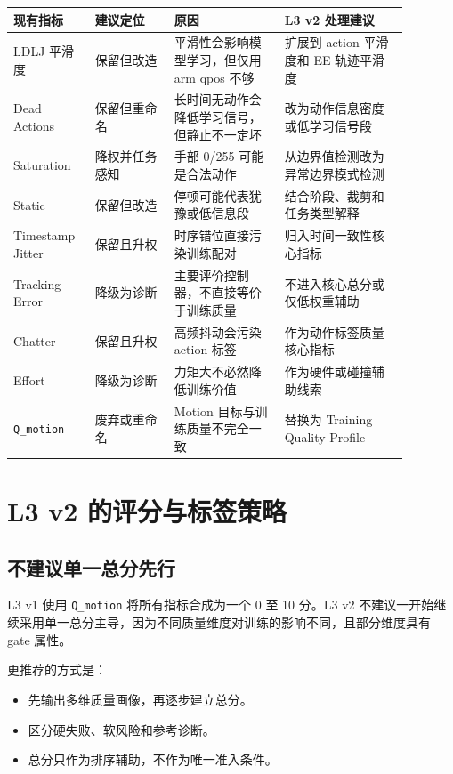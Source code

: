 \documentclass[UTF8,zihao=-4]{ctexart}
\begin{document}
\begin{longtable}{p{0.16\linewidth}p{0.18\linewidth}p{0.25\linewidth}p{0.29\linewidth}}
\toprule
\textbf{现有指标} & \textbf{建议定位} & \textbf{原因} & \textbf{L3 v2 处理建议} \\
\midrule
LDLJ 平滑度 & 保留但改造 & 平滑性会影响模型学习，但仅用 arm qpos 不够 & 扩展到 action 平滑度和 EE 轨迹平滑度 \\
Dead Actions & 保留但重命名 & 长时间无动作会降低学习信号，但静止不一定坏 & 改为动作信息密度或低学习信号段 \\
Saturation & 降权并任务感知 & 手部 0/255 可能是合法动作 & 从边界值检测改为异常边界模式检测 \\
Static & 保留但改造 & 停顿可能代表犹豫或低信息段 & 结合阶段、裁剪和任务类型解释 \\
Timestamp Jitter & 保留且升权 & 时序错位直接污染训练配对 & 归入时间一致性核心指标 \\
Tracking Error & 降级为诊断 & 主要评价控制器，不直接等价于训练质量 & 不进入核心总分或仅低权重辅助 \\
Chatter & 保留且升权 & 高频抖动会污染 action 标签 & 作为动作标签质量核心指标 \\
Effort & 降级为诊断 & 力矩大不必然降低训练价值 & 作为硬件或碰撞辅助线索 \\
\texttt{Q\_motion} & 废弃或重命名 & Motion 目标与训练质量不完全一致 & 替换为 Training Quality Profile \\
\bottomrule
\end{longtable}

\section{L3 v2 的评分与标签策略}

\subsection{不建议单一总分先行}

L3 v1 使用 \texttt{Q\_motion} 将所有指标合成为一个 0 至 10 分。L3 v2 不建议一开始继续采用单一总分主导，因为不同质量维度对训练的影响不同，且部分维度具有 gate 属性。

更推荐的方式是：

\begin{itemize}
  \item 先输出多维质量画像，再逐步建立总分。
  \item 区分硬失败、软风险和参考诊断。
  \item 总分只作为排序辅助，不作为唯一准入条件。
\end{itemize}
\end{document}
